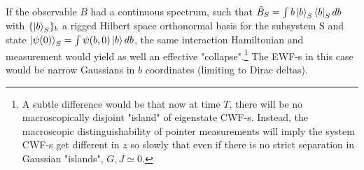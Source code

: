 \documentclass[11pt, a4paper]{article} %
\begin{document}
If the observable $B$ had a continuous spectrum, such that $\hat{B}_S=\int b\ket{b}_S\bra{b}_Sdb$ with $\{\ket{b}_S\}_b$ a rigged Hilbert space orthonormal basis for the subsystem S and state $\ket{\psi(0)}_S=\int\psi(b,0)\ket{b}db$, the same interaction Hamiltonian and measurement would yield as well an effective "collapse".\footnote{A subtle difference would be that now at time $T$, there will be no macroscopically disjoint "island" of eigenstate CWF-s. Instead, the macroscopic distinguishability of pointer measurements will imply the system CWF-s get different in $z$ so slowly that even if there is no strict separation in Gaussian "islands", $G,J\simeq 0$.} The EWF-s in this case would be narrow Gaussians in $b$ coordinates (limiting to Dirac deltas).\vspace{-0.1cm}
%
\end{document}
